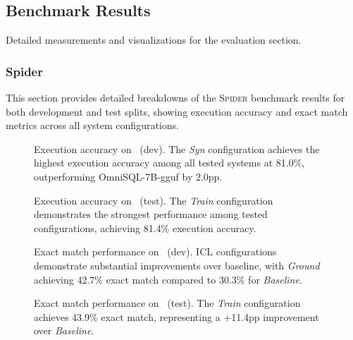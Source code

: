\subsection{Benchmark Results}\label{sec:appendix:benchmark-results}

Detailed measurements and visualizations for the evaluation section.

\subsubsection{Spider}\label{sec:appendix:benchmark-results-spider}

This section provides detailed breakdowns of the \textsc{Spider} benchmark results
for both development and test splits, showing execution accuracy and exact match
metrics across all system configurations.

\begin{figure}[htbp]
  \centering
  
  \caption{
    Execution accuracy on \Spider~(dev). The \textit{Syn} configuration
    achieves the highest execution accuracy among all tested systems at 81.0\%,
    outperforming OmniSQL-7B-gguf by 2.0pp.
  }
  \label{fig:appendix:spider-dev-ea}
\end{figure}

\begin{figure}[htbp]
  \centering
  
  \caption{
    Execution accuracy on \Spider~(test). The \textit{Train} configuration
    demonstrates the strongest performance among tested configurations, achieving
    81.4\% execution accuracy.
  }
  \label{fig:appendix:spider-test-ea}
\end{figure}

\begin{figure}[htbp]
  \centering
  
  \caption{
    Exact match performance on \Spider~(dev). ICL configurations demonstrate
    substantial improvements over baseline, with \textit{Ground} achieving 42.7\%
    exact match compared to 30.3\% for \textit{Baseline}.
  }
  \label{fig:appendix:spider-dev-em}
\end{figure}

\begin{figure}[htbp]
  \centering
  
  \caption{
    Exact match performance on \Spider~(test). The \textit{Train}
    configuration achieves 43.9\% exact match, representing a +11.4pp
    improvement over \textit{Baseline}.
  }
  \label{fig:appendix:spider-test-em}
\end{figure}

